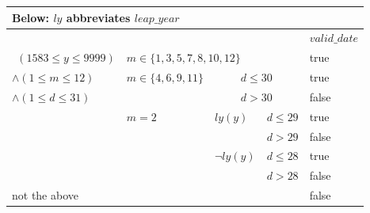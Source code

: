 \documentclass[runningheads,12pt]{article}
\begin{document}
\begin{table}[H]
{
\centering
\begin{tabular}{|l|l|l|l|l|}
\multicolumn{5}{l}{Below: $ly$ abbreviates $leap\_year$}\\
\hline
\multicolumn{4}{|c|}{} & $valid\_date$ \\ 
\hline
$~~ (1583 \leq y \leq 9999)$ & \multicolumn{3}{l|}{$m\in \{1,3,5,7,8,10,12\}$} &true\\ 
\cline{2-5}

$\land (1 \leq m \leq  12)$ & $m\in \{4,6,9,11\}$ & \multicolumn{2}{c|}{$d \leq 30$} &true \\ 
\cline{3-5}
$\land (1 \leq d \leq 31)$ &  & \multicolumn{2}{c|}{$d>30$} &false\\ 
\cline{2-5}

& $m=2$ & $ly(y)$ & $d\leq 29$ &true\\ 
\cline{4-5}
&  &  & $d>29$ &false\\ 
\cline{3-5}
&  & $\lnot ly(y)$ & $d\leq 28$ &true\\ 
\cline{4-5}
&  &  & $d>28$ &false\\ 
\cline{1-5}
\multicolumn{4}{|l|}{not the above } &false\\ 
\hline
\end{tabular}
}
\end{table}

\end{document}
